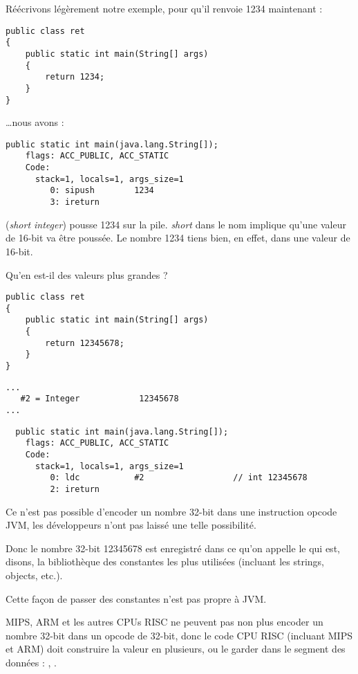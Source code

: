 Réécrivons légèrement notre exemple, pour qu'il renvoie 1234 maintenant :

\begin{lstlisting}[style=customjava]
public class ret
{
	public static int main(String[] args)
	{
		return 1234;
	}
}
\end{lstlisting}

\dots nous avons :

\begin{lstlisting}[caption=JDK 1.7 (excerpt)]
  public static int main(java.lang.String[]);
    flags: ACC_PUBLIC, ACC_STATIC
    Code:
      stack=1, locals=1, args_size=1
         0: sipush        1234
         3: ireturn       
\end{lstlisting}

 (\emph{short integer}) pousse 1234 sur la pile.
\emph{short} dans le nom implique qu'une valeur de 16-bit va être poussée. 
Le nombre 1234 tiens bien, en effet, dans une valeur de 16-bit.

Qu'en est-il des valeurs plus grandes ?

\begin{lstlisting}[style=customjava]
public class ret
{
	public static int main(String[] args) 
	{
		return 12345678;
	}
}
\end{lstlisting}

\begin{lstlisting}[caption=Constant pool]
...
   #2 = Integer            12345678
...
\end{lstlisting}

\begin{lstlisting}
  public static int main(java.lang.String[]);
    flags: ACC_PUBLIC, ACC_STATIC
    Code:
      stack=1, locals=1, args_size=1
         0: ldc           #2                  // int 12345678
         2: ireturn       
\end{lstlisting}

Ce n'est pas possible d'encoder un nombre 32-bit dans une instruction opcode JVM, 
les développeurs n'ont pas laissé une telle possibilité.

Donc le nombre 32-bit 12345678 est enregistré dans ce qu'on appelle le  qui est, disons, 
la bibliothèque des constantes les plus utilisées (incluant les strings, objects, etc.).

Cette façon de passer des constantes n'est pas propre à JVM.

MIPS, ARM et les autres CPUs RISC ne peuvent pas non plus encoder un nombre 32-bit 
dans un opcode de 32-bit, donc le code CPU RISC (incluant MIPS et ARM) doit construire la valeur 
en plusieurs, ou le garder dans le segment des données :
, .

